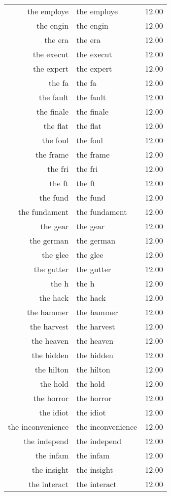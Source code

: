 \begin{table}[ht]
\begin{tabular}{rlr}
  the employe & the employe & 12.00 \\ 
  the engin & the engin & 12.00 \\ 
  the era & the era & 12.00 \\ 
  the execut & the execut & 12.00 \\ 
  the expert & the expert & 12.00 \\ 
  the fa & the fa & 12.00 \\ 
  the fault & the fault & 12.00 \\ 
  the finale & the finale & 12.00 \\ 
  the flat & the flat & 12.00 \\ 
  the foul & the foul & 12.00 \\ 
  the frame & the frame & 12.00 \\ 
  the fri & the fri & 12.00 \\ 
  the ft & the ft & 12.00 \\ 
  the fund & the fund & 12.00 \\ 
  the fundament & the fundament & 12.00 \\ 
  the gear & the gear & 12.00 \\ 
  the german & the german & 12.00 \\ 
  the glee & the glee & 12.00 \\ 
  the gutter & the gutter & 12.00 \\ 
  the h & the h & 12.00 \\ 
  the hack & the hack & 12.00 \\ 
  the hammer & the hammer & 12.00 \\ 
  the harvest & the harvest & 12.00 \\ 
  the heaven & the heaven & 12.00 \\ 
  the hidden & the hidden & 12.00 \\ 
  the hilton & the hilton & 12.00 \\ 
  the hold & the hold & 12.00 \\ 
  the horror & the horror & 12.00 \\ 
  the idiot & the idiot & 12.00 \\ 
  the inconvenience & the inconvenience & 12.00 \\ 
  the independ & the independ & 12.00 \\ 
  the infam & the infam & 12.00 \\ 
  the insight & the insight & 12.00 \\ 
  the interact & the interact & 12.00 \\ 

\end{tabular}
\end{table}
